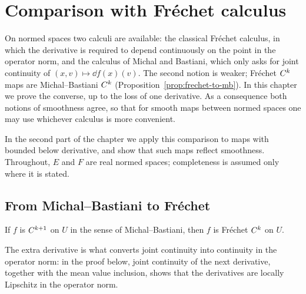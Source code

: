 \chapter{Comparison with Fréchet calculus}
\label{chap:frechet}

On normed spaces two calculi are available: the classical Fréchet calculus, in which the
derivative is required to depend continuously on the point in the operator norm, and the
calculus of Michal and Bastiani, which only asks for joint continuity of
$(x, v) \mapsto \dd f(x)(v)$. The second notion is weaker; Fréchet $C^{k}$ maps are
Michal--Bastiani $C^{k}$ (Proposition~\ref{prop:frechet-to-mb}). In this chapter we prove the
converse, up to the loss of one derivative. As a consequence both notions of smoothness agree,
so that for smooth maps between normed spaces one may use whichever calculus is more
convenient.

In the second part of the chapter we apply this comparison to maps with bounded below
derivative, and show that such maps reflect smoothness. Throughout, $E$ and $F$ are real normed
spaces; completeness is assumed only where it is stated.

\section{From Michal--Bastiani to Fréchet}

\begin{theorem}
  \label{thm:mb-to-frechet}
  \leanok
  If $f$ is $C^{k+1}$ on $U$ in the sense of Michal--Bastiani, then $f$ is Fréchet $C^{k}$ on
  $U$.
\end{theorem}

The extra derivative is what converts joint continuity into continuity in the operator norm:
in the proof below, joint continuity of the next derivative, together with the mean value
inclusion, shows that the derivatives are locally Lipschitz in the operator norm.

